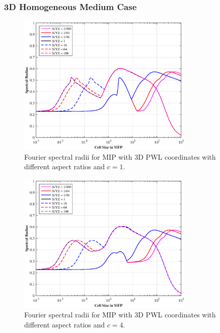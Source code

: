 \subsubsection{3D Homogeneous Medium Case}
\label{sec::DSA_Results_1G_3DHomo}

\begin{figure}
\centering
\includegraphics[width=0.75\textwidth]{figures/sec_DSA/SI_MIP_hex_PWLD1_AR1.eps}
\caption{Fourier spectral radii for MIP with 3D PWL coordinates with different aspect ratios and $c=1$.}
\label{fig::DSA_1G_Fourier_PWL_AR1}
\end{figure}

\begin{figure}
\centering
\includegraphics[width=0.75\textwidth]{figures/sec_DSA/SI_MIP_hex_PWLD1_AR4.eps}
\caption{Fourier spectral radii for MIP with 3D PWL coordinates with different aspect ratios and $c=4$.}
\label{fig::DSA_1G_Fourier_PWL_AR4}
\end{figure}

